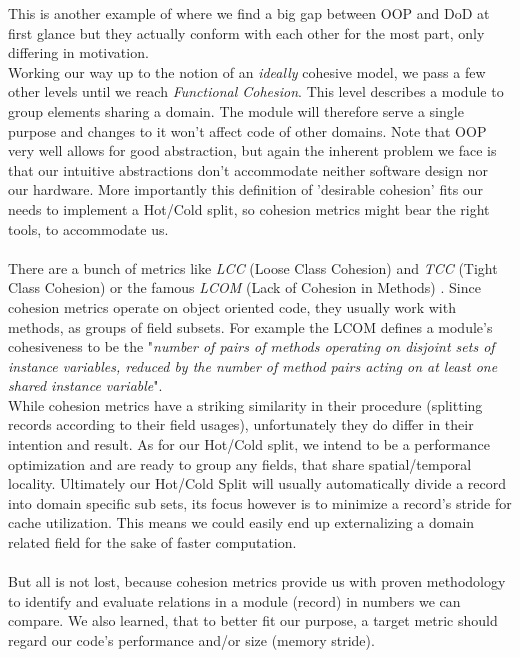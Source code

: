This is another example of where we find a big gap between OOP and DoD at first glance but they actually conform with each other for the most part, only differing in motivation.\\
Working our way up to the notion of an \textit{ideally} cohesive model, we pass a few other levels until we reach \textit{Functional Cohesion}. This level describes a module to group elements sharing a domain. The module will therefore serve a single purpose and changes to it won't affect code of other domains. Note that OOP very well allows for good abstraction, but again the inherent problem we face is that our intuitive abstractions don't accommodate neither software design nor our hardware. More importantly this definition of 'desirable cohesion' fits our needs to implement a Hot/Cold split, so cohesion metrics might bear the right tools, to accommodate us.\\\\
There are a bunch of metrics like \textit{LCC} (Loose Class Cohesion)  and  \textit{TCC}  (Tight  Class  Cohesion) or the famous \textit{LCOM} (Lack of Cohesion in Methods) . Since cohesion metrics operate on object oriented code, they usually work with methods, as groups of field subsets. For example the LCOM defines a module's cohesiveness to be the "\textit{number of pairs of methods operating on disjoint sets of instance variables, reduced by the number of method pairs acting on at least one shared instance variable}".\\
While cohesion metrics have a striking similarity in their procedure (splitting records according to their field usages), unfortunately they do differ in their intention and result. As for our Hot/Cold split, we intend to be a performance optimization and are ready to group any fields, that share spatial/temporal locality. Ultimately our Hot/Cold Split will usually automatically divide a record into domain specific sub sets, its focus however is to minimize a record's stride for cache utilization. This means we could easily end up externalizing a domain related field for the sake of faster computation.\\\\
But all is not lost, because cohesion metrics provide us with proven methodology to identify and evaluate relations in a module (record) in numbers we can compare. We also learned, that to better fit our purpose, a target metric should regard our code's performance and/or size (memory stride). 

